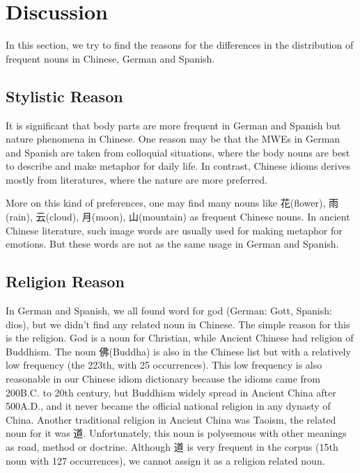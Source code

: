 \section{Discussion}\label{discuss}

In this section, we try to find the reasons for the differences in the distribution of frequent nouns in Chinese, German and Spanish. 

\subsection{Stylistic Reason}
It is significant that body parts are more frequent in German and Spanish but nature phenomena in Chinese. One reason may be that the MWEs in German and Spanish are taken from colloquial situations, where the body nouns are best to describe and make metaphor for daily life. In contrast, Chinese idioms derives mostly from literatures, where the nature are more preferred. 

More on this kind of preferences, one may find many nouns like 花(flower), 雨(rain), 云(cloud), 月(moon), 山(mountain) as frequent Chinese nouns. In ancient Chinese literature, such image words are usually used for making metaphor for emotions. But these words are not as the same usage in German and Spanish. 

\subsection{Religion Reason}
In German and Spanish, we all found word for god (German: Gott, Spanish: dios), but we didn't find any related noun in Chinese. The simple reason for this is the religion. God is a noun for Christian, while Ancient Chinese had religion of Buddhism. The noun 佛(Buddha) is also in the Chinese list but with a relatively low frequency (the 223th, with 25 occurrences). This low frequency is also reasonable in our Chinese idiom dictionary because the idioms came from 200B.C. to 20th century, but Buddhism widely spread in Ancient China after 500A.D., and it never became the official national religion in any dynasty of China. Another traditional religion in Ancient China was Taoism, the related noun for it was 道. Unfortunately, this noun is polysemous with other meanings as road, method or doctrine. Although 道 is very frequent in the corpus (15th noun with 127 occurrences), we cannot assign it as a religion related noun. 

